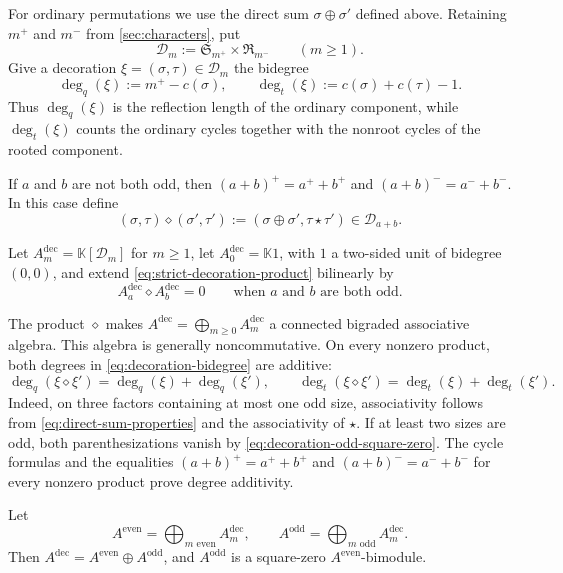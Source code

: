 \documentclass{amsart}
\theoremstyle{definition}
\theoremstyle{remark}
\newcommand{\kk}{\mathbb{K}}
\begin{document}
For ordinary permutations we use the direct sum $\sigma\oplus\sigma'$ defined
above.  Retaining $m^+$ and $m^-$ from
\cref{sec:characters}, put
\[
  \mathcal D_m:=\mathfrak S_{m^+}\times\mathfrak R_{m^-}
  \qquad(m\geq1).
\]
Give a decoration $\xi=(\sigma,\tau)\in\mathcal D_m$ the bidegree
\begin{equation}
\label{eq:decoration-bidegree}
  \deg_q(\xi):=m^+-c(\sigma),
  \qquad
  \deg_t(\xi):=c(\sigma)+c(\tau)-1.
\end{equation}
Thus $\deg_q(\xi)$ is the reflection length of the ordinary component, while
$\deg_t(\xi)$ counts the ordinary cycles together with the nonroot cycles
of the rooted component.

If $a$ and $b$ are not both odd, then
$(a+b)^+=a^++b^+$ and $(a+b)^-=a^-+b^-$.  In this case define
\begin{equation}
\label{eq:strict-decoration-product}
  (\sigma,\tau)\diamond(\sigma',\tau')
  :=(\sigma\oplus\sigma',\tau\star\tau')
  \in\mathcal D_{a+b}.
\end{equation}

Let $A_m^{\mathrm{dec}}=\kk[\mathcal D_m]$ for $m\geq1$, let
$A_0^{\mathrm{dec}}=\kk 1$, with $1$ a two-sided unit of bidegree $(0,0)$, and extend
\eqref{eq:strict-decoration-product}
bilinearly by
\begin{equation}
 A_a^{\mathrm{dec}}\diamond A_b^{\mathrm{dec}}=0
 \qquad\text{when $a$ and $b$ are both odd}.
 \label{eq:decoration-odd-square-zero}
\end{equation}

The product $\diamond$ makes
$A^{\mathrm{dec}}=\bigoplus_{m\geq0}A_m^{\mathrm{dec}}$ a connected bigraded
associative algebra.  This algebra is generally noncommutative.  On every
nonzero product, both degrees in
\eqref{eq:decoration-bidegree} are additive:
\[
  \deg_q(\xi\diamond\xi')
  =\deg_q(\xi)+\deg_q(\xi'),
  \qquad
  \deg_t(\xi\diamond\xi')
  =\deg_t(\xi)+\deg_t(\xi').
\]
Indeed, on three factors containing at most one odd size, associativity
follows from \eqref{eq:direct-sum-properties} and the associativity of
$\star$.  If at least two sizes are odd, both parenthesizations vanish by
\eqref{eq:decoration-odd-square-zero}.  The cycle formulas and the equalities
$(a+b)^+=a^++b^+$ and $(a+b)^-=a^-+b^-$ for every nonzero product prove
degree additivity.

Let
\[
 A^{\mathrm{even}}=\bigoplus_{m\text{ even}}A_m^{\mathrm{dec}},
 \qquad
 A^{\mathrm{odd}}=\bigoplus_{m\text{ odd}}A_m^{\mathrm{dec}}.
\]
Then $A^{\mathrm{dec}}=A^{\mathrm{even}}\oplus A^{\mathrm{odd}}$, and
$A^{\mathrm{odd}}$ is a square-zero $A^{\mathrm{even}}$-bimodule.
\end{document}
